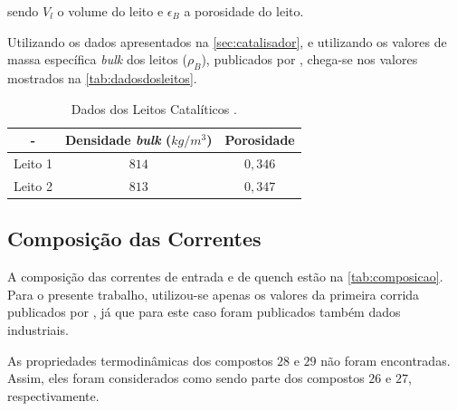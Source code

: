 sendo $V_l$ o volume do leito e $\epsilon_B$ a porosidade do leito.

Utilizando os dados apresentados na \autoref{sec:catalisador}, e utilizando os
valores de massa específica \emph{bulk} dos leitos ($\rho_{B}$), publicados por
, chega-se nos valores mostrados na
\autoref{tab:dadosdosleitos}.

\begin{table}[!htb]
\begin{center}
\caption{Dados dos Leitos Catalíticos \cite{Rojas2014a}.}
\label{tab:dadosdosleitos}
\small
\begin{tabular}{ccc}
{ - } & {Densidade \emph{bulk} ($kg/m^3$)} & {Porosidade} 
\\
\hline
{Leito 1} & $814$ & $0,346$ \\
{Leito 2} & $813$ & $0,347$ \\
\bottomrule
\end{tabular}
\end{center}
\end{table}

\subsection{Composição das Correntes} \label{sec:composicaocorrentes}

A composição das correntes de entrada e de quench estão na
\autoref{tab:composicao}. Para o presente trabalho, utilizou-se
apenas os valores da primeira corrida publicados por
, já que para este caso foram publicados
também dados industriais.

As propriedades termodinâmicas dos compostos $28$ e $29$ não foram
encontradas. Assim, eles foram considerados como sendo parte dos compostos
$26$ e $27$, respectivamente.

